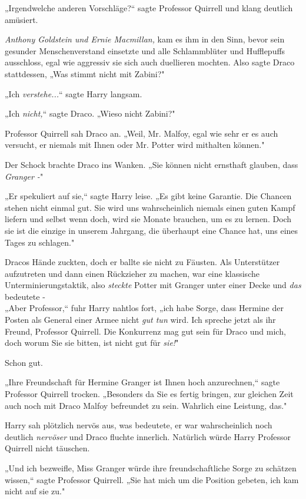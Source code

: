{„Irgendwelche anderen Vorschläge?“ sagte Professor Quirrell und klang deutlich amüsiert.

\emph{Anthony Goldstein und Ernie Macmillan,} kam es ihm in den Sinn, bevor sein gesunder Menschenverstand einsetzte und alle Schlammblüter und Hufflepuffs ausschloss, egal wie aggressiv sie sich auch duellieren mochten. Also sagte Draco stattdessen, „Was stimmt nicht mit Zabini?"

„Ich \emph{verstehe...}“ sagte Harry langsam.

„Ich \emph{nicht,}“ sagte Draco. „Wieso nicht Zabini?"

Professor Quirrell sah Draco an. „Weil, Mr. Malfoy, egal wie sehr er es auch versucht, er niemals mit Ihnen oder Mr. Potter wird mithalten können."

Der Schock brachte Draco ins Wanken. „Sie können nicht ernsthaft glauben, dass \emph{Granger -}"

„Er spekuliert auf sie,“ sagte Harry leise. „Es gibt keine Garantie. Die Chancen stehen nicht einmal gut. Sie wird uns wahrscheinlich niemals einen guten Kampf liefern und selbst wenn doch, wird sie Monate brauchen, um es zu lernen. Doch sie ist die einzige in unserem Jahrgang, die überhaupt eine Chance hat, uns eines Tages zu schlagen."

Dracos Hände zuckten, doch er ballte sie nicht zu Fäusten. Als Unterstützer aufzutreten und dann einen Rückzieher zu machen, war eine klassische Unterminierungstaktik, also \emph{steckte} Potter mit Granger unter einer Decke und \emph{das} bedeutete -\\ „Aber Professor,“ fuhr Harry nahtlos fort, „ich habe Sorge, dass Hermine der Posten als General einer Armee nicht \emph{gut tun} wird. Ich spreche jetzt als ihr Freund, Professor Quirrell. Die Konkurrenz mag gut sein für Draco und mich, doch worum Sie sie bitten, ist nicht gut für \emph{sie!}"

Schon gut.

„Ihre Freundschaft für Hermine Granger ist Ihnen hoch anzurechnen,“ sagte Professor Quirrell trocken. „Besonders da Sie es fertig bringen, zur gleichen Zeit auch noch mit Draco Malfoy befreundet zu sein. Wahrlich eine Leistung, das."

Harry sah plötzlich nervös aus, was bedeutete, er war wahrscheinlich noch deutlich \emph{nervöser} und Draco fluchte innerlich. Natürlich würde Harry Professor Quirrell nicht täuschen.

„Und ich bezweifle, Miss Granger würde ihre freundschaftliche Sorge zu schätzen wissen,“ sagte Professor Quirrell. „Sie hat mich um die Position gebeten, ich kam nicht auf sie zu."

}
